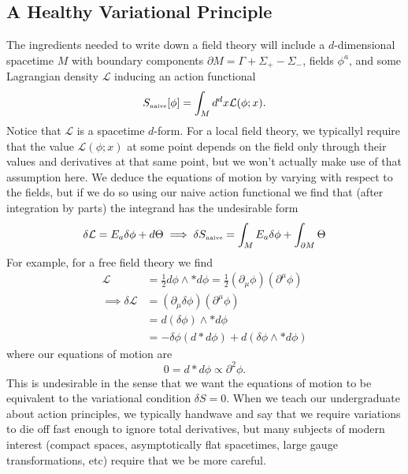 \documentclass[11pt,letterpaper]{article}
\newcommand{\mc}[1]{\mathcal{#1}}
\newcommand{\D}{\partial}
\begin{document}
\subsection{A Healthy Variational Principle}
The ingredients needed to write down a field theory will include a $d$-dimensional spacetime $M$ with boundary components $\D M = \Gamma + \Sigma_+ - \Sigma_-$, fields $\phi^a$, and some Lagrangian density $\mc{L}$ inducing an action functional \begin{equation}
S_{\mbox{\tiny{naive}}} [\phi] = \int_M d^d x \mc{L}(\phi; x).
\end{equation}
Notice that $\mc{L}$ is a spacetime $d$-form. For a local field theory, we typicallyl require that the value $\mc{L}(\phi; x)$ at some point depends on the field only through their values and derivatives at that same point, but we won't actually make use of that assumption here. We deduce the equations of motion by varying with respect to the fields, but if we do so using our naive action functional we find that (after integration by parts) the integrand has the undesirable form \begin{equation}
\delta \mc{L} = E_a \delta \phi + d \Theta \implies \delta S_{\mbox{\tiny{naive}}} = \int_M E_a \delta \phi + \int_{\D M} \Theta
\end{equation}
For example, for a free field theory we find \begin{equation}
\begin{aligned}
\mc{L} & = \frac{1}{2} d \phi \wedge * d \phi  = \frac{1}{2} (\D_\mu \phi)(\D^\mu \phi) \\
\implies \delta \mc{L} & = (\D_\mu \delta \phi) (\D^\mu \phi) \\
& = d(\delta \phi) \wedge * d \phi \\
& = - \delta \phi ( d * d \phi) + d (\delta \phi \wedge * d \phi) 
\end{aligned}
\end{equation}
where our equations of motion are \begin{equation}
0 = d * d \phi \propto \D^2 \phi.
\end{equation}
This is undesirable in the sense that we want the equations of motion to be equivalent to the variational condition $\delta S = 0$. When we teach our undergraduate about action principles, we typically handwave and say that we require variations to die off fast enough to ignore total derivatives, but many subjects of modern interest (compact spaces, asymptotically flat spacetimes, large gauge transformations, etc) require that we be more careful. \\
\end{document}
